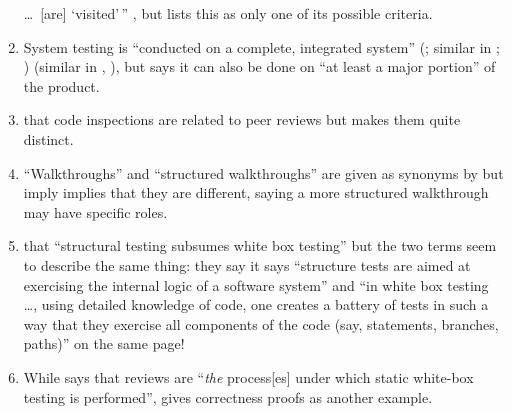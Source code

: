 \begin{enumerate}
          \dots\ [are] `visited'\,'' \citep[p.~19]{IEEE2021}, but
          \citet[pp.~82\==83]{Patton2006} lists this as only one of its
          possible criteria.
    \item %
          System testing is ``conducted on a complete, integrated system''
          \ifnotpaper (\citealp[p.~456]{IEEE2017}; similar in
              \citealp[Tab.~12.3]{PetersAndPedrycz2000};
              \citealp[p.~439]{vanVliet2000})\else \cite[p.~456]{IEEE2017}
              (similar in \cite[Tab.~12.3]{PetersAndPedrycz2000},
              \cite[p.~439]{vanVliet2000})\fi, but \citet[p.~109]{Patton2006}
          says it can also be done on ``at least a major portion'' of the product.
    \item %
           \citetISTQB{}  that code inspections
          are related to peer reviews but \citet[pp.~94\==95]{Patton2006} makes
          them quite distinct.
    \item %
          ``Walkthroughs'' and ``structured walkthroughs'' are given
          as synonyms by \citetISTQB{} but \citet[p.~484]{PetersAndPedrycz2000}
          \ifnotpaper imply \else implies \fi that they are different, saying a
          more structured walkthrough may have specific roles.
    \item %
           \citet[p.~447]{PetersAndPedrycz2000}
           that ``structural testing subsumes white box
          testing'' but the two terms seem to describe the same thing:
          \ifnotpaper they say \else it says \fi ``structure tests are aimed at
          exercising the internal logic of a software system'' and ``in white box
          testing \dots, using detailed knowledge of code, one creates a battery of
          tests in such a way that they exercise all components of the code
          (say, statements, branches, paths)'' on the same page!
    \item %
          While \citet[p.~92\ifnotpaper, emphasis added\fi]{Patton2006}
          says that reviews are ``\emph{the} process[es] under which static
          white-box testing is performed'', \citet[pp.~418\==419]{vanVliet2000}
          gives correctness proofs as another example.


\end{enumerate}
